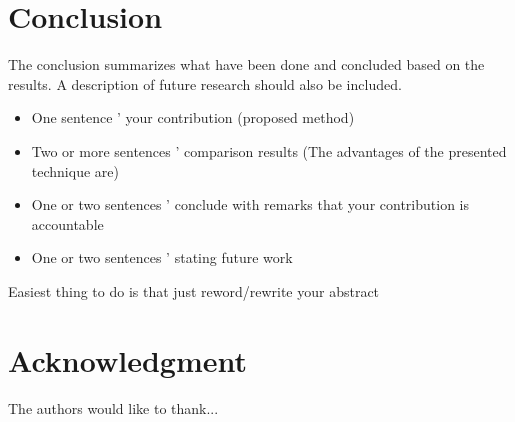 \documentclass[conference,letterpaper]{IEEEtran}
\begin{document}
%


\section{Conclusion}
The conclusion summarizes what have been done and concluded based on the results. A description of future research should also be included.
    \begin{itemize}
	   \item One sentence '  your contribution (proposed method)
	   \item Two or more sentences '  comparison results (The advantages of the presented technique are)
	   \item One or two sentences ' conclude with remarks that your contribution is accountable
	   \item One or two sentences ' stating future work
    \end{itemize}
Easiest thing to do is that just reword/rewrite your abstract





\section*{Acknowledgment}
The authors would like to thank...
\end{document}
